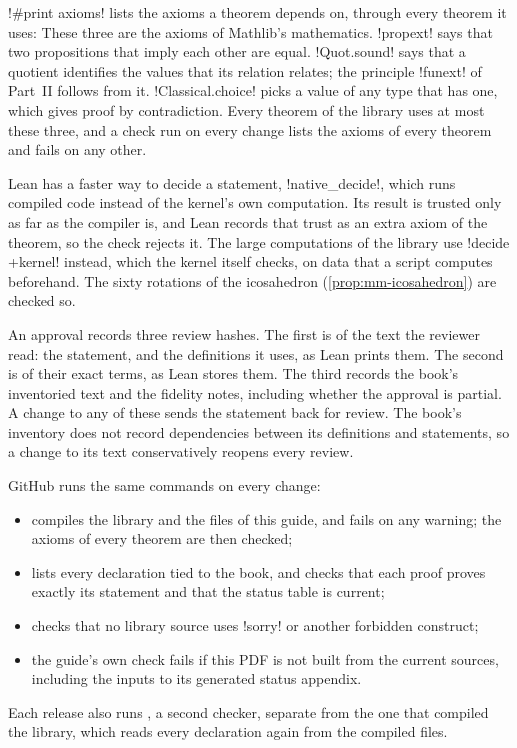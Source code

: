 \li!#print axioms! lists the axioms a theorem depends on, through every
theorem it uses:
These three are the axioms of Mathlib's mathematics. \li!propext! says that
two propositions that imply each other are equal. \li!Quot.sound! says that
a quotient identifies the values that its relation relates; the principle
\li!funext! of Part~II follows from it. \li!Classical.choice! picks a value
of any type that has one, which gives proof by contradiction. Every theorem
of the library uses at most these three, and a check run on every change
lists the axioms of every theorem and fails on any other.

Lean has a faster way to decide a statement, \li!native_decide!, which runs
compiled code instead of the kernel's own computation. Its result is trusted
only as far as the compiler is, and Lean records that trust as an extra
axiom of the theorem, so the check rejects it. The large computations of the
library use \li!decide +kernel! instead, which the kernel itself checks, on
data that a script computes beforehand. The sixty rotations of the
icosahedron (\cref{prop:mm-icosahedron}) are checked so.

An approval records three review hashes. The first is of the text the reviewer read:
the statement, and the definitions it uses, as Lean prints them. The second
is of their exact terms, as Lean stores them. The third records the book's
inventoried text and the fidelity notes, including whether the approval is
partial. A change to any of these sends the statement back for review.
The book's inventory does not record dependencies between its definitions
and statements, so a change to its text conservatively reopens every review.

GitHub runs the same commands on every change:
\begin{itemize}[leftmargin=1.4em]
\item {} compiles the library and the files of this
  guide, and fails on any warning; the axioms of every theorem are then
  checked;
\item {} lists every declaration tied to the book, and
   checks that each proof proves exactly its
  statement and that the status table is current;
\item {} checks that no library source uses \li!sorry!
  or another forbidden construct;
\item the guide's own check fails if this PDF is not built from the current
  sources, including the inputs to its generated status appendix.
\end{itemize}
Each release also runs , a second checker, separate from the
one that compiled the library, which reads every declaration again from the
compiled files.

